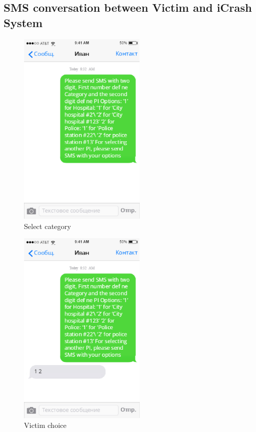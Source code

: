 \subsection{SMS conversation between Victim and iCrash System}

\begin{figure}
  \centering
    \includegraphics[width=6cm]{images/mockups/feature3-PI/1.eps}
  \caption{Select category}
  \label{fig:Selectcategory}
\end{figure}


\begin{figure}
  \centering
    \includegraphics[width=6cm]{images/mockups/feature3-PI/2.eps}
  \caption{Victim choice}
  \label{fig:Victimchoice}
\end{figure}  


